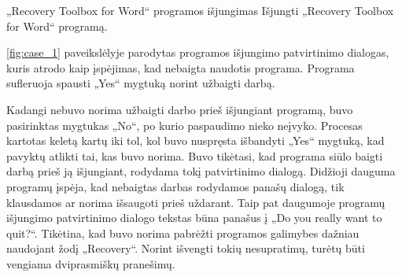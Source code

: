 ﻿\begin{xcase}{„Recovery Toolbox for Word“ programos išjungimas}
  \xcgoal
  {
    Išjungti „Recovery Toolbox for Word“ programą.
  }
  \xctools
  {
    \ref{fig:case_1} paveikslėlyje parodytas programos išjungimo patvirtinimo dialogas, kuris atrodo kaip įspėjimas, kad nebaigta naudotis programa. Programa sufleruoja spausti „Yes“ mygtuką norint užbaigti darbą.

  }
  \xcresult
  {
    Kadangi nebuvo norima užbaigti darbo prieš išjungiant programą, buvo pasirinktas mygtukas „No“, po kurio paspaudimo nieko neįvyko. Procesas kartotas keletą kartų iki tol, kol buvo nuspręsta išbandyti „Yes“ mygtuką, kad pavyktų atlikti tai, kas buvo norima.
  }
  \xcprinciples
  {
    {
      Buvo tikėtasi, kad programa siūlo baigti darbą prieš ją išjungiant, rodydama tokį patvirtinimo dialogą.
    }
	{
	  Didžioji dauguma programų įspėja, kad nebaigtas darbas rodydamos panašų dialogą, tik klausdamos ar norima išsaugoti prieš uždarant.
	  Taip pat daugumoje programų išjungimo patvirtinimo dialogo tekstas būna panašus į „Do you really want to quit?“.
	}
  }
  \xcthoughts
  {
    Tikėtina, kad buvo norima pabrėžti programos galimybes dažniau naudojant žodį „Recovery“. Norint išvengti tokių nesupratimų, turėtų būti vengiama dviprasmiškų pranešimų.
  }
\end{xcase}